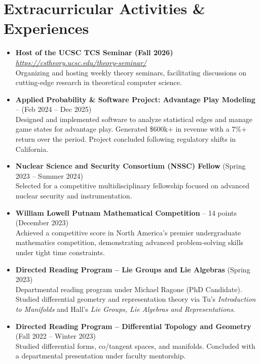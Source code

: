 \documentclass{curriculum-vitae}
\begin{document}
\section{Extracurricular Activities \& Experiences}
\begin{itemize}
  \item \textbf{Host of the UCSC TCS Seminar (Fall 2026)} \emph{\href{https://cstheory.ucsc.edu/theory-seminar/}{https://cstheory.ucsc.edu/theory-seminar/}}  \\
    Organizing and hosting weekly theory seminars, facilitating discussions on cutting-edge research in theoretical computer science.

  \item \textbf{Applied Probability \& Software Project: Advantage Play Modeling} -- (Feb 2024 -- Dec 2025)\\
    Designed and implemented software to analyze statistical edges and manage game states for advantage play. Generated \$600k+ in revenue with a 7\%+ return over the period. Project concluded following regulatory shifts in California.

  \item \textbf{Nuclear Science and Security Consortium (NSSC) Fellow} (Spring 2023 -- Summer 2024) \\
    Selected for a competitive multidisciplinary fellowship focused on advanced nuclear security and instrumentation.

  \item \textbf{William Lowell Putnam Mathematical Competition} -- 14 points (December 2023) \\
    Achieved a competitive score in North America's premier undergraduate mathematics competition, demonstrating advanced problem-solving skills under tight time constraints.


  \item \textbf{Directed Reading Program -- Lie Groups and Lie Algebras} (Spring 2023) \\
    Departmental reading program under Michael Ragone (PhD Candidate). Studied differential geometry and representation theory via Tu's \emph{Introduction to Manifolds} and Hall's \emph{Lie Groups, Lie Algebras and Representations}.

  \item \textbf{Directed Reading Program -- Differential Topology and Geometry} (Fall 2022 -- Winter 2023) \\
    Studied differential forms, co/tangent spaces, and manifolds. Concluded with a departmental presentation under faculty mentorship.


\end{itemize}
\end{document}
